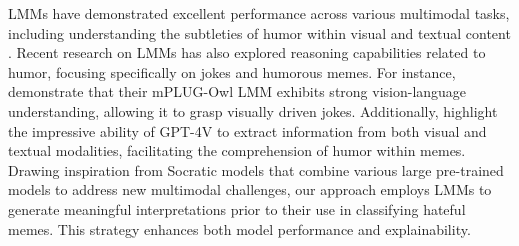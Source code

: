 LMMs have demonstrated excellent performance across various multimodal tasks, including understanding the subtleties of humor within visual and textual content \cite{yang2023dawn,zheng2023judging,han2023evaluate}. Recent research on LMMs has also explored reasoning capabilities related to humor, focusing specifically on jokes and humorous memes. For instance, \citet{ye2023mplug} demonstrate that their mPLUG-Owl LMM exhibits strong vision-language understanding, allowing it to grasp visually driven jokes. Additionally, \citet{yang2023dawn} highlight the impressive ability of GPT-4V to extract information from both visual and textual modalities, facilitating the comprehension of humor within memes. Drawing inspiration from Socratic models \cite{zeng2022socratic} that combine various large pre-trained models to address new multimodal challenges, our approach employs LMMs to generate meaningful interpretations prior to their use in classifying hateful memes. This strategy enhances both model performance and explainability.


